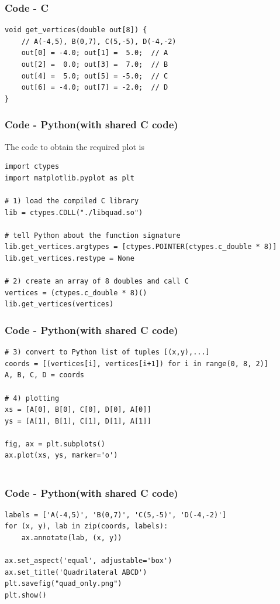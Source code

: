 \documentclass{beamer}
\theoremstyle{remark}
\numberwithin{equation}{section}
\begin{document}
\begin{frame}[fragile]
    \frametitle{Code - C}
    \begin{lstlisting}
void get_vertices(double out[8]) {
    // A(-4,5), B(0,7), C(5,-5), D(-4,-2)
    out[0] = -4.0; out[1] =  5.0;  // A
    out[2] =  0.0; out[3] =  7.0;  // B
    out[4] =  5.0; out[5] = -5.0;  // C
    out[6] = -4.0; out[7] = -2.0;  // D
}
\end{lstlisting}
\end{frame}


\begin{frame}[fragile]
    \frametitle{Code - Python(with shared C code)}
    The code to obtain the required plot is
    \begin{lstlisting}
import ctypes
import matplotlib.pyplot as plt

# 1) load the compiled C library
lib = ctypes.CDLL("./libquad.so")

# tell Python about the function signature
lib.get_vertices.argtypes = [ctypes.POINTER(ctypes.c_double * 8)]
lib.get_vertices.restype = None

# 2) create an array of 8 doubles and call C
vertices = (ctypes.c_double * 8)()
lib.get_vertices(vertices)

\end{lstlisting}
\end{frame}
\begin{frame}[fragile]
\frametitle{Code - Python(with shared C code)}
\begin{lstlisting}
# 3) convert to Python list of tuples [(x,y),...]
coords = [(vertices[i], vertices[i+1]) for i in range(0, 8, 2)]
A, B, C, D = coords

# 4) plotting
xs = [A[0], B[0], C[0], D[0], A[0]]
ys = [A[1], B[1], C[1], D[1], A[1]]

fig, ax = plt.subplots()
ax.plot(xs, ys, marker='o')


\end{lstlisting}
\end{frame}

\begin{frame}[fragile]
\frametitle{Code - Python(with shared C code)}
\begin{lstlisting}
labels = ['A(-4,5)', 'B(0,7)', 'C(5,-5)', 'D(-4,-2)']
for (x, y), lab in zip(coords, labels):
    ax.annotate(lab, (x, y))

ax.set_aspect('equal', adjustable='box')
ax.set_title('Quadrilateral ABCD')
plt.savefig("quad_only.png")
plt.show()
\end{lstlisting}
\end{frame}
\end{document}
